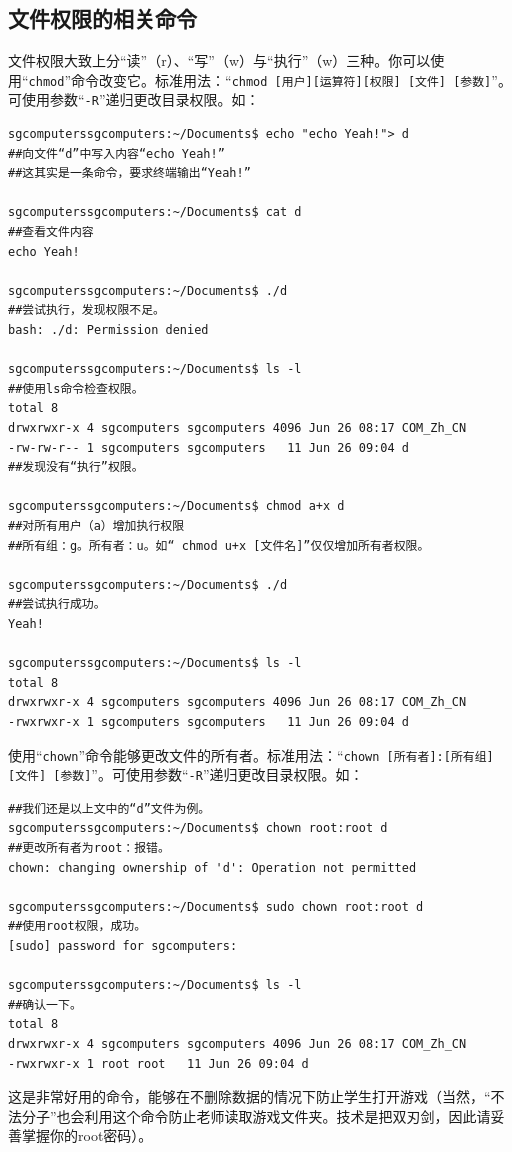 \subsection{文件权限的相关命令}
文件权限大致上分“读”（r）、“写”（w）与“执行”（w）三种。你可以使用“\verb|chmod|”命令改变它。标准用法：“\verb|chmod [用户][运算符][权限] [文件] [参数]|”。可使用参数“\verb|-R|”递归更改目录权限。如：
\begin{verbatim}
sgcomputerssgcomputers:~/Documents$ echo "echo Yeah!"> d
##向文件“d”中写入内容“echo Yeah!”
##这其实是一条命令，要求终端输出“Yeah!”

sgcomputerssgcomputers:~/Documents$ cat d
##查看文件内容
echo Yeah!

sgcomputerssgcomputers:~/Documents$ ./d
##尝试执行，发现权限不足。
bash: ./d: Permission denied

sgcomputerssgcomputers:~/Documents$ ls -l
##使用ls命令检查权限。
total 8
drwxrwxr-x 4 sgcomputers sgcomputers 4096 Jun 26 08:17 COM_Zh_CN
-rw-rw-r-- 1 sgcomputers sgcomputers   11 Jun 26 09:04 d
##发现没有“执行”权限。

sgcomputerssgcomputers:~/Documents$ chmod a+x d
##对所有用户（a）增加执行权限
##所有组：g。所有者：u。如“ chmod u+x [文件名]”仅仅增加所有者权限。

sgcomputerssgcomputers:~/Documents$ ./d
##尝试执行成功。
Yeah!

sgcomputerssgcomputers:~/Documents$ ls -l
total 8
drwxrwxr-x 4 sgcomputers sgcomputers 4096 Jun 26 08:17 COM_Zh_CN
-rwxrwxr-x 1 sgcomputers sgcomputers   11 Jun 26 09:04 d

\end{verbatim} \par
使用“\verb|chown|”命令能够更改文件的所有者。标准用法：“\verb|chown [所有者]:[所有组] [文件] [参数]|”。可使用参数“\verb|-R|”递归更改目录权限。如：
\begin{verbatim}
##我们还是以上文中的“d”文件为例。
sgcomputerssgcomputers:~/Documents$ chown root:root d
##更改所有者为root：报错。
chown: changing ownership of 'd': Operation not permitted

sgcomputerssgcomputers:~/Documents$ sudo chown root:root d
##使用root权限，成功。
[sudo] password for sgcomputers: 

sgcomputerssgcomputers:~/Documents$ ls -l
##确认一下。
total 8
drwxrwxr-x 4 sgcomputers sgcomputers 4096 Jun 26 08:17 COM_Zh_CN
-rwxrwxr-x 1 root root   11 Jun 26 09:04 d
\end{verbatim} \par
这是非常好用的命令，能够在不删除数据的情况下防止学生打开游戏（当然，“不法分子”也会利用这个命令防止老师读取游戏文件夹。技术是把双刃剑，因此请妥善掌握你的root密码）。
